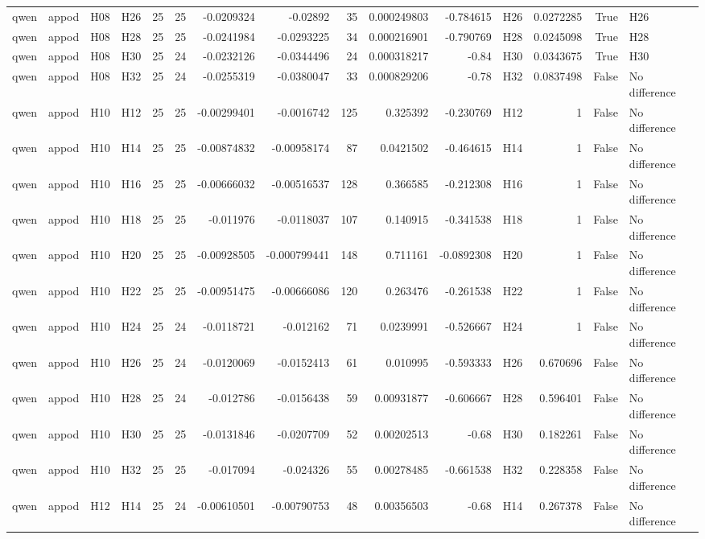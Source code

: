 \begin{longtable}{llllrrrrrrrlrrl}
qwen & appod & H08 & H26 & 25 & 25 & -0.0209324 & -0.02892 & 35 & 0.000249803 & -0.784615 & H26 & 0.0272285 & True & H26 \\
qwen & appod & H08 & H28 & 25 & 25 & -0.0241984 & -0.0293225 & 34 & 0.000216901 & -0.790769 & H28 & 0.0245098 & True & H28 \\
qwen & appod & H08 & H30 & 25 & 24 & -0.0232126 & -0.0344496 & 24 & 0.000318217 & -0.84 & H30 & 0.0343675 & True & H30 \\
qwen & appod & H08 & H32 & 25 & 24 & -0.0255319 & -0.0380047 & 33 & 0.000829206 & -0.78 & H32 & 0.0837498 & False & No difference \\
qwen & appod & H10 & H12 & 25 & 25 & -0.00299401 & -0.0016742 & 125 & 0.325392 & -0.230769 & H12 & 1 & False & No difference \\
qwen & appod & H10 & H14 & 25 & 25 & -0.00874832 & -0.00958174 & 87 & 0.0421502 & -0.464615 & H14 & 1 & False & No difference \\
qwen & appod & H10 & H16 & 25 & 25 & -0.00666032 & -0.00516537 & 128 & 0.366585 & -0.212308 & H16 & 1 & False & No difference \\
qwen & appod & H10 & H18 & 25 & 25 & -0.011976 & -0.0118037 & 107 & 0.140915 & -0.341538 & H18 & 1 & False & No difference \\
qwen & appod & H10 & H20 & 25 & 25 & -0.00928505 & -0.000799441 & 148 & 0.711161 & -0.0892308 & H20 & 1 & False & No difference \\
qwen & appod & H10 & H22 & 25 & 25 & -0.00951475 & -0.00666086 & 120 & 0.263476 & -0.261538 & H22 & 1 & False & No difference \\
qwen & appod & H10 & H24 & 25 & 24 & -0.0118721 & -0.012162 & 71 & 0.0239991 & -0.526667 & H24 & 1 & False & No difference \\
qwen & appod & H10 & H26 & 25 & 24 & -0.0120069 & -0.0152413 & 61 & 0.010995 & -0.593333 & H26 & 0.670696 & False & No difference \\
qwen & appod & H10 & H28 & 25 & 24 & -0.012786 & -0.0156438 & 59 & 0.00931877 & -0.606667 & H28 & 0.596401 & False & No difference \\
qwen & appod & H10 & H30 & 25 & 25 & -0.0131846 & -0.0207709 & 52 & 0.00202513 & -0.68 & H30 & 0.182261 & False & No difference \\
qwen & appod & H10 & H32 & 25 & 25 & -0.017094 & -0.024326 & 55 & 0.00278485 & -0.661538 & H32 & 0.228358 & False & No difference \\
qwen & appod & H12 & H14 & 25 & 24 & -0.00610501 & -0.00790753 & 48 & 0.00356503 & -0.68 & H14 & 0.267378 & False & No difference \\

\end{longtable}
